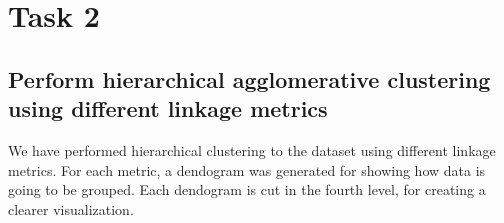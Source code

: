 \documentclass[12pt]{article}
\begin{document}
\section{Task 2}

\subsection{Perform hierarchical agglomerative clustering using different linkage metrics}

We have performed hierarchical clustering to the dataset using different linkage metrics. For each metric, a dendogram was generated for showing how data is going to be grouped. Each dendogram is cut in the fourth level, for creating a clearer visualization. 

\begin{figure} [H]
\centering
{}
\hspace{0mm}
\end{figure}
\end{document}
